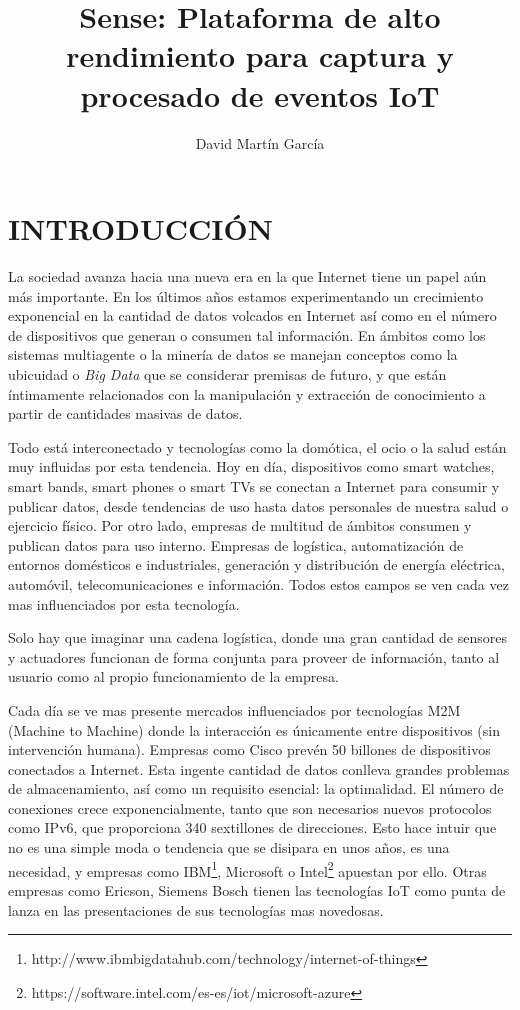\documentclass{pre-tfg}
\title{Sense: Plataforma de alto rendimiento para captura y procesado de eventos IoT}
\author{David Martín García}
\begin{document}
\maketitle
\tableofcontents

\newpage

\section{INTRODUCCIÓN}

La sociedad avanza hacia una nueva era en la que Internet tiene un papel aún más
importante. En los últimos años estamos experimentando un crecimiento exponencial en la
cantidad de datos volcados en Internet así como en el número de dispositivos que generan o
consumen tal información. En ámbitos como los sistemas multiagente o la minería de datos
se manejan conceptos como la ubicuidad o \emph{Big Data} que se considerar premisas de
futuro, y que están íntimamente relacionados con la manipulación y extracción de
conocimiento a partir de cantidades masivas de datos.

Todo está interconectado y tecnologías como la domótica, el ocio o la salud están muy
influidas por esta tendencia. Hoy en día, dispositivos como smart watches, smart bands,
smart phones o smart TVs se conectan a Internet para consumir y publicar datos, desde
tendencias de uso hasta datos personales de nuestra salud o ejercicio físico. Por otro
lado, empresas de multitud de ámbitos consumen y publican datos para uso interno. Empresas
de logística, automatización de entornos domésticos e industriales, generación y
distribución de energía eléctrica, automóvil, telecomunicaciones e información. Todos
estos campos se ven cada vez mas influenciados por esta tecnología.

Solo hay que imaginar una cadena logística, donde una gran cantidad de sensores y
actuadores funcionan de forma conjunta para proveer de información, tanto al usuario como
al propio funcionamiento de la empresa.

Cada día se ve mas presente mercados influenciados por tecnologías M2M (Machine to
Machine) donde la interacción es únicamente entre dispositivos (sin intervención
humana). Empresas como Cisco prevén 50 billones de dispositivos conectados a
Internet. Esta ingente cantidad de datos conlleva grandes problemas de almacenamiento, así
como un requisito esencial: la optimalidad. El número de conexiones crece
exponencialmente, tanto que son necesarios nuevos protocolos como IPv6, que proporciona 340
sextillones de direcciones. Esto hace intuir que no es una simple moda o tendencia que se
disipara en unos años, es una necesidad, y empresas como
IBM\footnote{http://www.ibmbigdatahub.com/technology/internet-of-things}, Microsoft o
Intel\footnote{https://software.intel.com/es-es/iot/microsoft-azure} apuestan por
ello. Otras empresas como Ericson, Siemens Bosch tienen las tecnologías IoT como punta de
lanza en las presentaciones de sus tecnologías mas novedosas.
\end{document}
